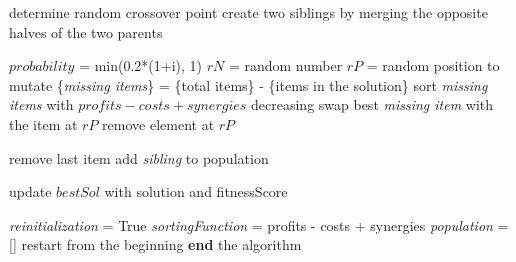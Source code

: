 \documentclass{article}
\begin{document}
    \begin{algorithm} [h!]                    
    \begin{algorithmic} [1]
    
   \State {\color{trolleygrey}{\#crossover}}
        \State determine random crossover point
        \State create two siblings by merging the opposite halves of the two parents
    \EndFor
    

    
    \State {\color{trolleygrey}{\#mutation}}
    \State  $ probability$ = min(0.2*(1+i), 1)
        \State $rN$ = random number
            \State $rP$ = random position to mutate
            \State \{\textsl{missing items}\} = \{total items\} - \{items in the solution\}
                \State sort \textsl{missing items} with $profits-costs+synergies$ decreasing
                \State swap best \textsl{missing item} with the item at $rP$
            \Else
                \State remove element at $rP$
            \EndIf

                \State remove last item
            \EndWhile
            \State add \textsl{sibling} to population
        \EndIf
    \EndFor
       
       
    
    \State {\color{trolleygrey}{\#find optimum for the current population}}
    \State update $bestSol$ with solution and fitnessScore
   
        \State \textsl{reinitialization} = True
        \State \textsl{sortingFunction} = profits - costs + synergies
        \State \textsl{population} = []
        \State restart from the beginning
    \EndIf
        \State \textbf{end} the algorithm
    \EndIf
\EndFor
\end{algorithmic}
\end{algorithm}
\end{document}

